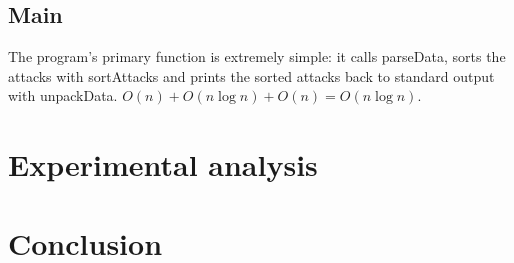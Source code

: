 \documentclass[10pt,a4paper]{article}
\begin{document}
\subsection*{Main}

The program's primary function is extremely simple: it calls parseData, sorts the attacks with sortAttacks and prints the sorted attacks back to standard output with unpackData. $O(n) + O(n\log{n}) + O(n) = O(n\log{n})$.

\section*{Experimental analysis}

\section*{Conclusion}
\end{document}
